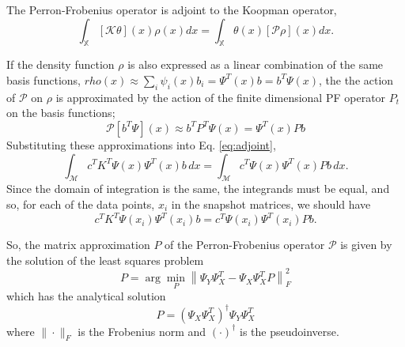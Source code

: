\documentclass[pdflatex,sn-mathphys]{sn-jnl}%
\newcommand{\XX}{\mathbb{X}}
\renewcommand{\P}{\mathcal{P}}
\newcommand{\K}{\mathcal{K}}
\theoremstyle{thmstyleone}%
\theoremstyle{thmstyletwo}%
\theoremstyle{thmstylethree}%
\begin{document}
The Perron-Frobenius operator is adjoint to the Koopman operator, 
\begin{equation}
    \int_{\XX} [\K \theta](x) \rho(x) dx = \int_{\XX} \theta(x) [\P \rho](x)dx.
    \label{eq:adjoint}
\end{equation}

If the density function $\rho$ is also expressed as a linear combination of the same basis functions, $rho(x) \approx \sum_i \psi_i(x) b_i = \Psi^T(x) b = b^T\Psi(x)$, the the action of $\mathcal{P}$ on $\rho$ is approximated by the action of the finite dimensional PF operator $P_t$ on the basis functions;   
\[
\P[b^T\Psi](x) \approx b^TP^T\Psi(x) = \Psi^T(x)Pb
\]
Substituting these approximations into Eq. \eqref{eq:adjoint}, 
\begin{equation}
    \int_{\mathcal{M}} c^TK^T\Psi(x) \Psi^T(x)b \, dx 
    = 
    \int_{\mathcal{M}} c^T\Psi(x) \Psi^T(x)Pb\,dx.
\end{equation}
Since the domain of integration is the same, the integrands must be equal, and so, for each of the data points, $x_i$ in the snapshot matrices, we should have
\[
c^TK^T\Psi(x_i) \Psi^T(x_i)b  
    =  
c^T\Psi(x_i) \Psi^T(x_i)Pb.
\]

So, the matrix approximation $P$ of the Perron-Frobenius operator $\P$ is given by the solution of the least squares problem 
\begin{equation}
    P = \arg \min_{P} \left\| \Psi_Y\Psi_X^T - \Psi_X\Psi_X^TP\right\|^2_F
\end{equation}
which has the analytical solution 
\begin{equation}
    P = (\Psi_X\Psi_X^T)^\dagger\Psi_Y\Psi_X^T
\end{equation}
where $\|\cdot\|_F$ is the Frobenius norm and $(\cdot)^\dagger$ is the pseudoinverse.
\end{document}
